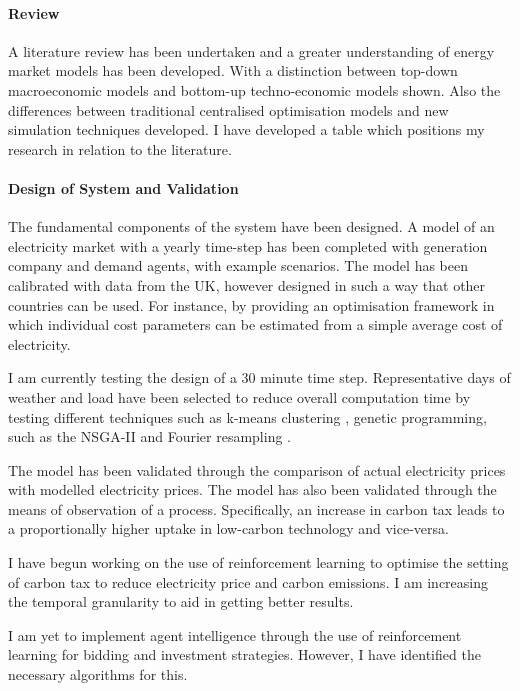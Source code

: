 \documentclass[12pt]{article}
\begin{document}
\paragraph{Review}

A literature review has been undertaken and a greater understanding of energy market models has been developed. With a distinction between top-down macroeconomic models and bottom-up techno-economic models shown. Also the differences between traditional centralised optimisation  models and new simulation techniques developed. I have developed a table which positions my research in relation to the literature.

\paragraph{Design of System and Validation}

The fundamental components of the system have been designed. A model of an electricity market with a yearly time-step has been completed with generation company and demand agents, with example scenarios. The model has been calibrated with data from the UK, however designed in such a way that other countries can be used. For instance, by providing an optimisation framework in which individual cost parameters can be estimated from a simple average cost of electricity.

I am currently testing the design of a 30 minute time step. Representative days of weather and load have been selected to reduce overall computation time by testing different techniques such as k-means clustering \cite{Forgy65}, genetic programming, such as the NSGA-II \cite{Valkanas2014} and Fourier resampling \cite{Cooley2006}. 

The model has been validated through the comparison of actual electricity prices with modelled electricity prices. The model has also been validated through the means of observation of a process. Specifically, an increase in carbon tax leads to a proportionally higher uptake in low-carbon technology and vice-versa.

I have begun working on the use of reinforcement learning to optimise the setting of carbon tax to reduce electricity price and carbon emissions. I am increasing the temporal granularity to aid in getting better results.

I am yet to implement agent intelligence through the use of reinforcement learning for bidding and investment strategies. However, I have identified the necessary algorithms for this.
\end{document}
